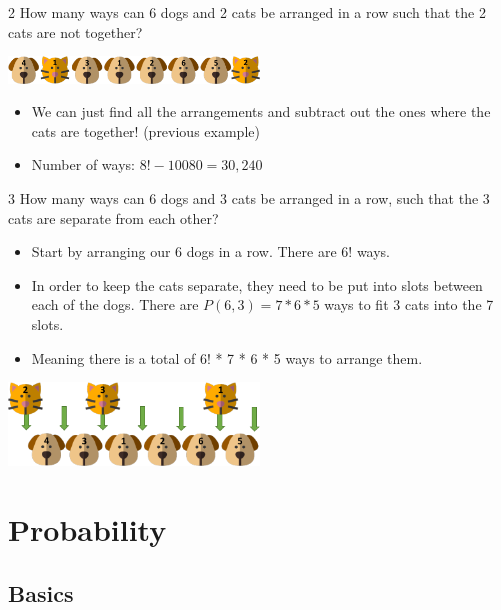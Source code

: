 \documentclass[12pt, letterpaper]{article}
\newcommand{\exheader}[1][ex]{{\tiny{#1}\normalsize}}
\begin{document}
\bigbreak
\bigbreak

\exheader[2] How many ways can 6 dogs and 2 cats be arranged in a row such that the 2 cats are not together?
\begin{center}
	\includegraphics[width=0.5\textwidth]{images/counting/catsdogs2.png}	
\end{center}
\begin{itemize}[leftmargin=*,  label={}]
	\item We can just find all the arrangements and subtract out the ones where the cats are together! (previous example)
	\item Number of ways: $8! - 10080 = 30,240$
\end{itemize}

\bigbreak
\bigbreak

\exheader[3] How many ways can 6 dogs and 3 cats be arranged in a row, such that the 3 cats are separate from each other?
\begin{itemize}[leftmargin=*,  label={}]
	\item Start by arranging our 6 dogs in a row. There are 6! ways. 
	\item In order to keep the cats separate, they need to be put into slots between each of the dogs. There are $P(6,3) = 7 * 6 * 5$ ways to fit 3 cats into the 7 slots. 
	\item Meaning there is a total of 6! * 7 * 6 * 5 ways to arrange them.
\end{itemize}
\begin{center}
	\includegraphics[width=0.5\textwidth]{images/counting/catsanddogs3.png}		
\end{center}

\pagebreak

\section{Probability}

\subsection{Basics}
\end{document}
